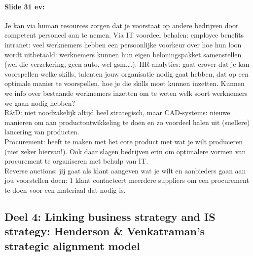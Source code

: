 \documentclass[10pt,a4paper]{report}
\begin{document}
\paragraph{Slide 31 ev:}Je kan via human resources zorgen dat je voorstaat op andere bedrijven door competent personeel aan te nemen. Via IT voordeel behalen: employee benefits intranet: veel werknemers hebben een persoonlijke voorkeur over hoe hun loon wordt uitbetaald: werknemers kunnen hun eigen beloningspakket samenstellen (wel die verzekering, geen auto, wel gsm,…). HR analytics: gaat erover dat je kan voorspellen welke skills, talenten jouw organisatie nodig gaat hebben, dat op een optimale manier te voorspellen, hoe je die skills moet kunnen inzetten. Kunnen we info over bestaande werknemers inzetten om te weten welk soort werknemers we gaan nodig hebben?\\
R\&D: niet noodzakelijk altijd heel strategisch, maar CAD-systems: nieuwe manieren om aan productontwikkeling te doen en zo voordeel halen uit (snellere) lancering van producten.\\
Procurement: heeft te maken met het core product met wat je wilt produceren (niet zeker hiervan!). Ook daar slagen bedrijven erin om optimalere vormen van procurement te organiseren met behulp van IT.\\
Reverse auctions: jij gaat als klant aangeven wat je wilt en aanbieders gaan aan jou voorstellen doen: 1 klant contacteert meerdere suppliers om een procurement te doen voor een materiaal dat nodig is.

\subsection{Deel 4: Linking business strategy and IS strategy: Henderson \& Venkatraman's strategic alignment model}
\end{document}
